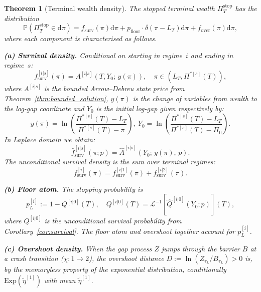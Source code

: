 \documentclass[11pt,a4paper]{article}
\numberwithin{equation}{section}
\newtheorem{theorem}{Theorem}[section]
\newcommand{\Prob}{\mathbb{P}}
\newcommand{\Lp}{\mathcal{L}}
\newcommand{\dd}{\mathrm{d}}
\begin{document}
\begin{theorem}[Terminal wealth density]\label{thm:wealth_density}
The stopped terminal wealth $\Pi^{\mathrm{stop}}_T$ has the distribution
\begin{equation}\label{eq:wealth_density}
\Prob(\Pi^{\mathrm{stop}}_T \in \dd\pi) = f_{\mathrm{surv}}(\pi)\dd\pi + p_{\mathrm{floor}} \cdot \delta(\pi - L_T)\dd\pi + f_{\mathrm{over}}(\pi)\dd\pi,
\end{equation}
where each component is characterised as follows.

\medskip\noindent\textbf{(a) Survival density.} Conditional on starting in regime~$i$ and ending in regime~$s$:
\begin{equation}\label{eq:surv_density}
f^{[i|s]}_{\mathrm{surv}}(\pi) = A^{[i|s]}(T, Y_0;\, y(\pi)), \quad \pi \in (L_T, \Pi^{*[s]}(T)),
\end{equation}
where  $A^{[i|s]}$ is the bounded Arrow--Debreu state price from Theorem~\ref{thm:bounded_solution}, $y(\pi)$ is the change of variables from wealth to the log-gap coordinate and $Y_0$ is the initial log-gap given respectively by:
\begin{equation}\label{eq:surv_density_1}
y(\pi) = \ln\!\left(\frac{\Pi^{*[s]}(T) - L_T}{\Pi^{*[s]}(T) - \pi}\right), \ Y_0 = \ln\!\left(\frac{\Pi^{*[s]}(T) - L_T}{\Pi^{*[s]}(T) - \Pi_0}\right).
\end{equation}
In Laplace domain we obtain:
\begin{equation}\label{eq:surv_density_laplace}
\hat{f}^{[i|s]}_{\mathrm{surv}}(\pi; p) = \hat{A}^{[i|s]}(Y_0;\, y(\pi),\, p).
\end{equation}
The unconditional survival density is the sum over terminal regimes:
\begin{equation}
f^{[i]}_{\mathrm{surv}}(\pi) = f^{[i|1]}_{\mathrm{surv}}(\pi) + f^{[i|2]}_{\mathrm{surv}}(\pi).
\end{equation}

\medskip\noindent\textbf{(b) Floor atom.} The stopping probability is
\begin{equation}\label{eq:total_stop}
p^{[i]}_L := 1 - Q^{[i|0]}(T), \quad Q^{[i|0]}(T) = \Lp^{-1}\!\left[\hat{Q}^{[i|0]}(Y_0; p)\right](T),
\end{equation}
where $Q^{[i|0]}$ is the unconditional survival probability from Corollary~\ref{cor:survival}. The floor atom and overshoot together account for $p^{[i]}_L$.

\medskip\noindent\textbf{(c) Overshoot density.} When the gap process $Z$ jumps through the barrier $B$ at a crash transition ($\chi: 1 \to 2$), the overshoot distance $D := \ln(Z_{\tau_L}/B_{\tau_L}) > 0$ is, by the memoryless property of the exponential distribution, conditionally $\mathrm{Exp}(\tilde\eta^{[1]})$ with mean $\tilde\eta^{[1]}$.


\end{theorem}
\end{document}
